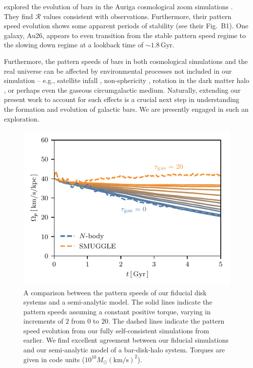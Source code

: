 \documentclass[twocolumn,linenumbers,trackchanges]{aastex631}
\newcommand{\Rot}{\ensuremath{\mathcal{R}}}
\newcommand{\kms}{\ensuremath{\textrm{km}/\textrm{s}}}
\newcommand{\Msun}{\ensuremath{M_{\odot}}}
\begin{document}
\citet{2021AA...650L..16F} explored the evolution of bars in the Auriga
cosmological zoom simulations \citep{2017MNRAS.467..179G}. They find \Rot{}
values consistent with observations. Furthermore, their pattern speed evolution
shows some apparent periods of stability (see their Fig.~B1). One galaxy, Au26,
appears to even transition from the stable pattern speed regime to the slowing
down regime at a lookback time of $\sim1.8\,\textrm{Gyr}$.

Furthermore, the pattern speeds of bars in both cosmological simulations and the
real universe can be affected by environmental processes not included in our
simulation -- e.g., satellite infall \citep{2011Natur.477..301P}, non-sphericity
\citep{2013MNRAS.429.1949A}, rotation in the dark matter halo
\citep{2013MNRAS.434.1287S, 2014ApJ...783L..18L, 2018MNRAS.476.1331C,
2019MNRAS.488.5788C}, or perhaps even the gaseous circumgalactic medium.
Naturally, extending our present work to account for such effects is a crucial
next step in understanding the formation and evolution of galactic bars. We are
presently engaged in such an exploration.

\begin{figure}
    \centering
    \includegraphics[width=\columnwidth]{fig/samGvar.pdf}
    \caption{A comparison between the pattern speeds of our fiducial disk
    systems and a semi-analytic model. The solid lines indicate the pattern
    speeds assuming a constant positive torque, varying in increments of $2$
    from $0$ to $20$. The dashed lines indicate the pattern speed evolution from
    our fully self-consistent simulations from earlier. We find excellent
    agreement between our fiducial simulations and our semi-analytic model of a
    bar-disk-halo system. Torques are given in code units ($10^{10}\Msun
    \left(\kms\right)^2$).}
    \label{fig:sam}
\end{figure}
\end{document}
